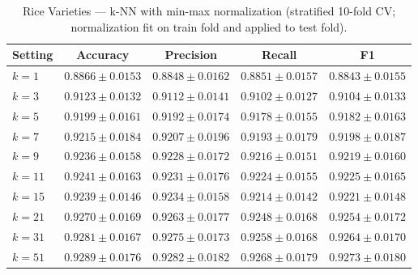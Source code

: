 \documentclass{article}
\begin{document}
\begin{table}[H]
\centering
\small
\caption{Rice Varieties --- k-NN with min-max normalization (stratified 10-fold CV; normalization fit on train fold and applied to test fold).}
\label{tab:rice-knn-norm}
\begin{tabular}{@{}lcccc@{}}
\toprule
Setting & Accuracy & Precision & Recall & F1 \\
\midrule
$k=1$  & $0.8866 \pm 0.0153$ & $0.8848 \pm 0.0162$ & $0.8851 \pm 0.0157$ & $0.8843 \pm 0.0155$ \\
$k=3$  & $0.9123 \pm 0.0132$ & $0.9112 \pm 0.0141$ & $0.9102 \pm 0.0127$ & $0.9104 \pm 0.0133$ \\
$k=5$  & $0.9199 \pm 0.0161$ & $0.9192 \pm 0.0174$ & $0.9178 \pm 0.0155$ & $0.9182 \pm 0.0163$ \\
$k=7$  & $0.9215 \pm 0.0184$ & $0.9207 \pm 0.0196$ & $0.9193 \pm 0.0179$ & $0.9198 \pm 0.0187$ \\
$k=9$  & $0.9236 \pm 0.0158$ & $0.9228 \pm 0.0172$ & $0.9216 \pm 0.0151$ & $0.9219 \pm 0.0160$ \\
$k=11$ & $0.9241 \pm 0.0163$ & $0.9231 \pm 0.0176$ & $0.9224 \pm 0.0155$ & $0.9225 \pm 0.0165$ \\
$k=15$ & $0.9239 \pm 0.0146$ & $0.9234 \pm 0.0158$ & $0.9214 \pm 0.0142$ & $0.9221 \pm 0.0148$ \\
$k=21$ & $0.9270 \pm 0.0169$ & $0.9263 \pm 0.0177$ & $0.9248 \pm 0.0168$ & $0.9254 \pm 0.0172$ \\
$k=31$ & $0.9281 \pm 0.0167$ & $0.9275 \pm 0.0173$ & $0.9258 \pm 0.0168$ & $0.9264 \pm 0.0170$ \\
$k=51$ & $\mathbf{0.9289 \pm 0.0176}$ & $\mathbf{0.9282 \pm 0.0182}$ & $\mathbf{0.9268 \pm 0.0179}$ & $\mathbf{0.9273 \pm 0.0180}$ \\
\bottomrule
\end{tabular}
\end{table}
\end{document}
